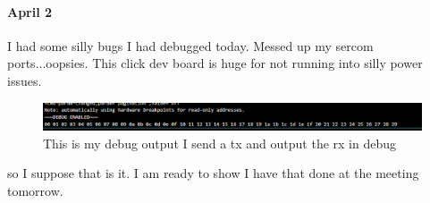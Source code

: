 \documentclass{article}
\begin{document}
\paragraph{April 2} I had some silly bugs I had debugged today. Messed up my sercom ports...oopsies. This click dev board is huge for not running into silly power issues. 
\begin{figure}
    \centering
    \includegraphics[width=0.5\linewidth]{RS485Debugg.png}
    \caption{This is my debug output I send a tx and output the rx in debug}
    \label{fig:enter-label}
\end{figure}
so I suppose that is it. I am ready to show I have that done at the meeting tomorrow. 



\end{document}
